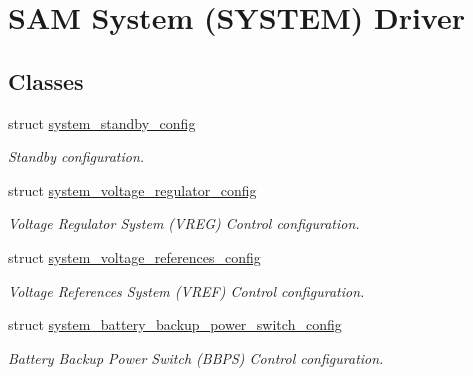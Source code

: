 \hypertarget{group__asfdoc__sam0__system__group}{}\section{S\+A\+M System (S\+Y\+S\+T\+E\+M) Driver}
\label{group__asfdoc__sam0__system__group}
\subsection*{Classes}
\begin{DoxyCompactItemize}
\item 
struct \hyperlink{structsystem__standby__config}{system\+\_\+standby\+\_\+config}
\begin{DoxyCompactList}\small\item\em Standby configuration. \end{DoxyCompactList}\item 
struct \hyperlink{structsystem__voltage__regulator__config}{system\+\_\+voltage\+\_\+regulator\+\_\+config}
\begin{DoxyCompactList}\small\item\em Voltage Regulator System (V\+R\+E\+G) Control configuration. \end{DoxyCompactList}\item 
struct \hyperlink{structsystem__voltage__references__config}{system\+\_\+voltage\+\_\+references\+\_\+config}
\begin{DoxyCompactList}\small\item\em Voltage References System (V\+R\+E\+F) Control configuration. \end{DoxyCompactList}\item 
struct \hyperlink{structsystem__battery__backup__power__switch__config}{system\+\_\+battery\+\_\+backup\+\_\+power\+\_\+switch\+\_\+config}
\begin{DoxyCompactList}\small\item\em Battery Backup Power Switch (B\+B\+P\+S) Control configuration. \end{DoxyCompactList}\end{DoxyCompactItemize}
